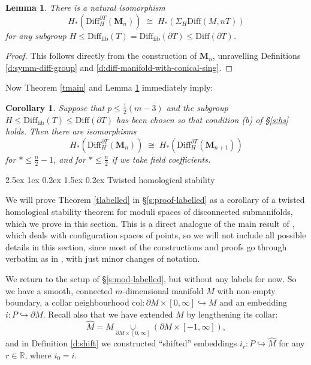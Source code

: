 \documentclass[reqno,a4paper]{article}
\makeatletter
\numberwithin{equation}{section}
\theoremstyle{italicised}
\newtheorem{lem}[thm]{Lemma}
\newtheorem{acoro}[athm]{Corollary}\renewcommand{\theacoro}{\Alph{acoro}}
\theoremstyle{upright}
\theoremstyle{italicised-restate}
\renewcommand*{\section}{\@startsection{section}{1}{\z@}%
	{2.5ex \@plus 1ex \@minus 0.2ex}%
	{1.5ex \@plus 0.2ex}%
	{\normalfont\large\bfseries}}
\newcommand{\bR}{\mathbb{R}}
\renewcommand{\leq}{\leqslant}
\makeatother
\begin{document}
\begin{lem}\label{l:relate-sing-symm}
There is a natural isomorphism
\[
H_* (\mathrm{Diff}_H^{\partial T}(\mathbf{M}_n)) \;\cong\; H_* (\Sigma_H \mathrm{Diff}(M,nT))
\]
for any subgroup $H \leq \mathrm{Diff}_{\mathrm{fib}}(T) = \mathrm{Diff}_{\mathrm{fib}}(\partial T) \leq \mathrm{Diff}(\partial T)$.
\end{lem}
\begin{proof}
This follows directly from the construction of $\mathbf{M}_n$, unravelling Definitions \ref{d:symm-diff-group} and \ref{d:diff-manifold-with-conical-sing}.
\end{proof}

Now Theorem \ref{tmain} and Lemma \ref{l:relate-sing-symm} immediately imply:

\begin{acoro}\label{coro-singularities}
Suppose that $p \leq \tfrac12(m-3)$ and the subgroup $H \leq \mathrm{Diff}_{\mathrm{fib}}(T) \leq \mathrm{Diff}(\partial T)$ has been chosen so that condition \textup{(b)} of \textup{\S\ref{s:hs}} holds. Then there are isomorphisms
\[
H_* (\mathrm{Diff}_H^{\partial T}(\mathbf{M}_n)) \;\cong\; H_* (\mathrm{Diff}_H^{\partial T}(\mathbf{M}_{n+1}))
\]
for $* \leq \tfrac{n}{2} - 1$, and for $* \leq \tfrac{n}{2}$ if we take field coefficients.
\end{acoro}


\section{Twisted homological stability}\label{s:ths}


We will prove Theorem \ref{tlabelled} in \S\ref{s:proof-labelled} as a corollary of a twisted homological stability theorem for moduli spaces of disconnected submanifolds, which we prove in this section. This is a direct analogue of the main result of \cite{Palmer2018Twistedhomologicalstability}, which deals with configuration spaces of points, so we will not include all possible details in this section, since most of the constructions and proofs go through verbatim as in \cite{Palmer2018Twistedhomologicalstability}, with just minor changes of notation.

We return to the setup of \S\ref{s:mod-labelled}, but without any labels for now. So we have a smooth, connected $m$-dimensional manifold $M$ with non-empty boundary, a collar neighbourhood $\mathrm{col} \colon \partial M \times [0,\infty] \hookrightarrow M$ and an embedding $i \colon P \hookrightarrow \partial M$. Recall also that we have extended $M$ by lengthening its collar:
\[
\hat{M} = M \underset{\partial M \times [0,\infty]}{\cup} (\partial M \times [-1,\infty]),
\]
and in Definition \ref{d:shift} we constructed ``shifted'' embeddings $i_r \colon P \hookrightarrow \hat{M}$ for any $r \in \bR$, where $i_0 = i$.
\end{document}
